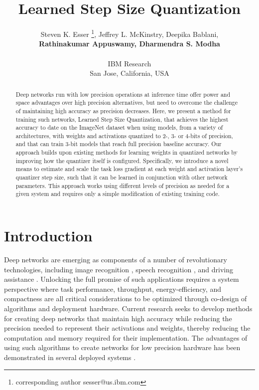 \documentclass{article}
\title{Learned Step Size Quantization}
\author{Steven K. Esser \thanks{corresponding author sesser@us.ibm.com},
Jeffrey L. McKinstry,
Deepika Bablani, \\
\textbf{Rathinakumar Appuswamy,
Dharmendra S. Modha}\\
\\
IBM Research \\
San Jose, California, USA \\
%
}
\begin{document}
\maketitle



\begin{abstract}
Deep networks run with low precision operations at inference time offer power and space advantages over high precision alternatives, but need to overcome the challenge of maintaining high accuracy as precision decreases.
%
Here, we present a method for training such networks, Learned Step Size Quantization, that achieves the highest accuracy to date on the ImageNet dataset when using models, from a variety of architectures, with weights and activations quantized to 2-, 3- or 4-bits of precision, and that can train 3-bit models that reach full precision baseline accuracy.
%
Our approach builds upon existing methods for learning weights in quantized networks by improving how the quantizer itself is configured.
%
Specifically, we introduce a novel means to estimate and scale the task loss gradient at each weight and activation layer's quantizer step size, such that it can be learned in conjunction with other network parameters.
%
This approach works using different levels of precision as needed for a given system and requires only a simple modification of existing training code.



\end{abstract}


\section{Introduction}

Deep networks are emerging as components of a number of revolutionary technologies, including image recognition \citep{krizhevsky2012imagenet}, speech recognition \citep{hinton2012deep}, and driving assistance \citep{xu2017end}.
%
Unlocking the full promise of such applications requires a system perspective where task performance, throughput, energy-efficiency, and compactness are all critical considerations to be optimized through co-design of algorithms and deployment hardware.
%
Current research seeks to develop methods for creating deep networks that maintain high accuracy while reducing the precision needed to represent their activations and weights, thereby reducing the computation and memory required for their implementation.
%
The advantages of using such algorithms to create networks for low precision hardware has been demonstrated in several deployed systems \citep{Esser11441, jouppi2017datacenter, qiu2016going}.
\end{document}
